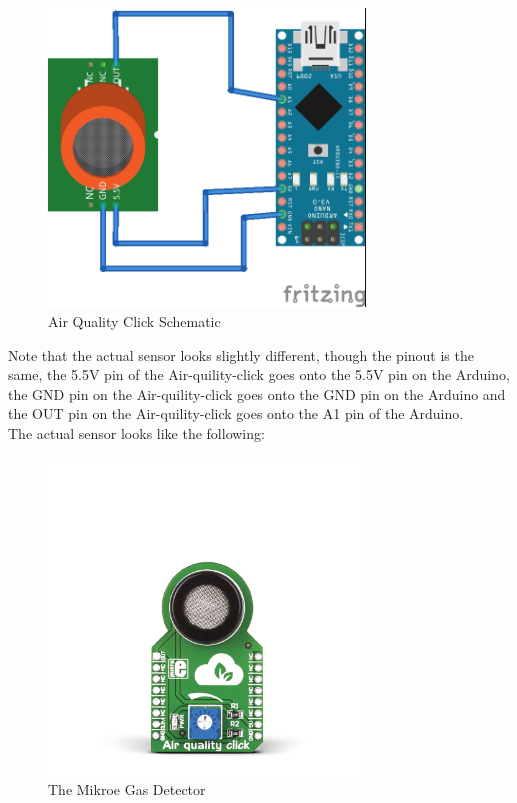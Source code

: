 \documentclass{report}
\begin{document}
\begin{figure}[H]
	\centering
\includegraphics[width=0.75\textwidth]{images/Mikroe-Gas-sensor-schematic.jpg}
	\caption{Air Quality Click Schematic}
\end{figure}

Note that the actual sensor looks slightly different, though the pinout is the same, the 5.5V pin of the Air-quility-click goes onto the 5.5V pin on the Arduino, the GND pin on the Air-quility-click  goes onto the GND pin on the Arduino and the OUT pin on the Air-quility-click goes onto the A1 pin of the Arduino. \\
The actual sensor looks like the following:\\

\begin{figure}[H]
	\centering
\includegraphics[width=0.75\textwidth]{images/air-quality-click-breakout.jpg} 
	\caption{The Mikroe Gas Detector}
\end{figure}
\end{document}
